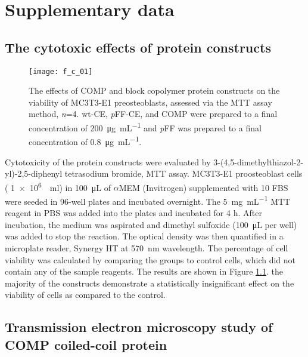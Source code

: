 \chapter{Supplementary data}

\section{The cytotoxic effects of protein constructs}
\begin{figure}[h!] \centering \texttt{[image: f\_c\_01]}
    \caption{The effects of COMP and block copolymer protein constructs on the
        viability of MC3T3-E1 preosteoblasts, assessed via the MTT assay method,
        \emph{n}=4. wt-CE, \emph{p}FF-CE, and COMP were prepared to a final
        concentration of \SI{200}{\ug\per\mL} and \emph{p}FF was prepared to a
        final concentration of \SI{0.8}{\ug\per\mL}.}\label{fig:mtt_results}
    \end{figure}
Cytotoxicity of the protein constructs were evaluated by
3-(4,5-dimethylthiazol-2-yl)-2,5-diphenyl tetrasodium bromide, MTT assay.
MC3T3-E1 proosteoblast cells (
\SI[scientific-notation=true,retain-unity-mantissa=true]{1e6}{\per\ml}) in
\SI{100}{\uL} of ${\alpha}$MEM (Invitrogen) supplemented with \SI{10}{\volper}
FBS were seeded in 96-well plates and incubated overnight. The
\SI{5}{\mg\per\mL} MTT reagent in PBS was added into the plates and incubated
for 4 h. After incubation, the medium was aspirated and dimethyl sulfoxide
(\SI{100}{\uL} per well) was added to stop the reaction. The optical density was
then quantified in a microplate reader, Synergy HT at \SI{570}{\nm} wavelength.
The percentage of cell viability was calculated by comparing the groups to
control cells, which did not contain any of the sample reagents. The results are
shown in Figure \ref{fig:mtt_results}. the majority of the constructs
demonstrate a statistically insignificant effect on the viability of cells as
compared to the control.


\section{Transmission electron microscopy study of COMP coiled-coil protein}

